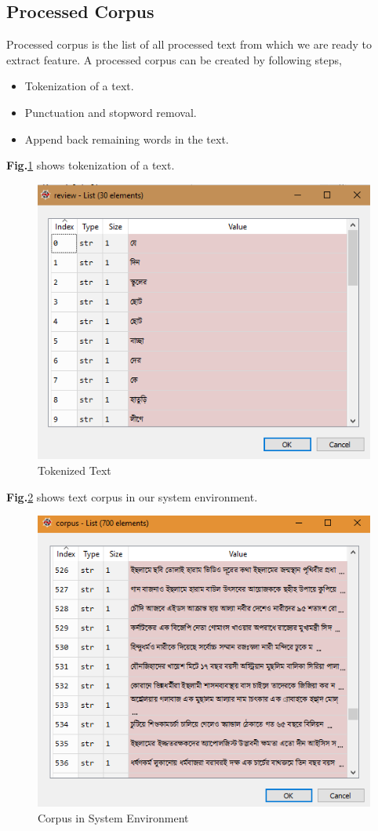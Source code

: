 \documentclass[12pt,a4paper]{report}
\begin{document}
\subsection{Processed Corpus}
Processed corpus is the list of all processed text from which we are ready to extract feature. A processed corpus can be created by following steps,
\begin{itemize}
    \item Tokenization of a text.
    \item Punctuation and stopword removal.
    \item Append back remaining words in the text.
\end{itemize}
\textbf{Fig.}\ref{fig:tkn} shows tokenization of a text.
\begin{figure}[h!]
    \centering
    \includegraphics[scale=0.6]{Figures/tokenize.PNG}
    \caption{Tokenized Text}
    \label{fig:tkn}
\end{figure}
\par\noindent
\textbf{Fig.}\ref{fig:crps} shows text corpus in our system environment.
\begin{figure}[h!]
    \centering
    \includegraphics[scale=0.6]{Figures/corpus.PNG}
    \caption{Corpus in System Environment}
    \label{fig:crps}
\end{figure}
\end{document}
